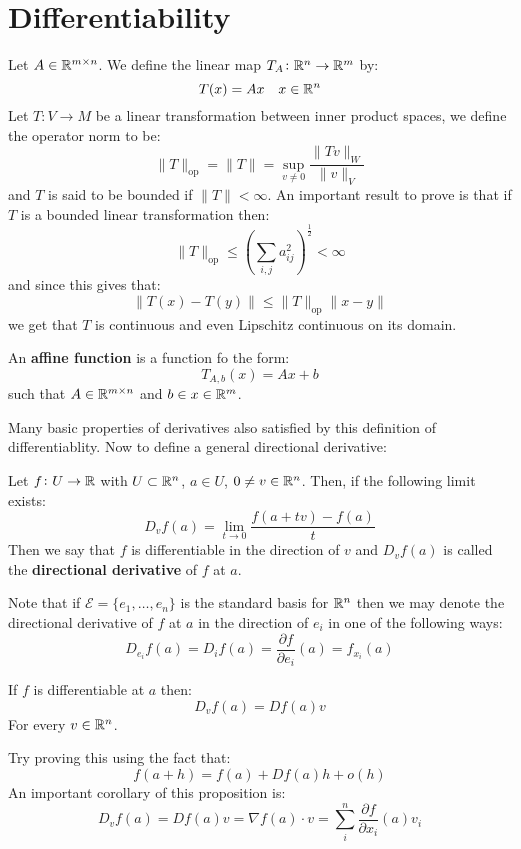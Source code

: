 \documentclass[11pt,a4paper]{article}
\begin{document}
	\section{Differentiability}
	Let $A \in \mathbb{R}^{m \times n}$. We define the linear map 
	$T_A \colon \mathbb{R}^n \to \mathbb{R}^m$ by:
	\[
		T(x) = Ax \quad x\in \mathbb{R}^n
	\]
	Let $T \colon V \to M$ be a linear transformation between inner product
	spaces, we define the operator norm to be:
	\[
		\|T\|_{\mathrm{op}} = \|T\| = \sup_{v \neq 0}{\frac{\|Tv\|_W}{\|v\|_V}}
	\]
	and $T$ is said to be bounded if $\|T\| < \infty$. An important result
	to prove is that if $T$ is a bounded linear transformation then:
	\[
		\|T\|_{\mathrm{op}} \le 
		\left(\sum_{i,j}{}a_{ij}^{2}\right)^{\frac{1}{2}} < \infty
	\]
	and since this gives that:
	\[
		\|T(x) - T(y)\| \le \|T\|_{\mathrm{op}}\|x-y\|
	\]
	we get that $T$ is continuous and even Lipschitz continuous on its domain.
	\begin{definition}
	An \textbf{affine function} is a function fo the form:
	\[
		T_{A,b}(x) = Ax + b
	\]
	such that $A\in\mathbb{R}^{m \times n}$ and $b\in x\in \mathbb{R}^{m}$.
	\end{definition}
	\noindent Many basic properties of derivatives also satisfied by this
	definition of differentiablity. Now to define a general directional
	derivative:
	\begin{definition}
		Let $f \colon U \to \mathbb{R}$ with $U \subset \mathbb{R}^n$, $a \in U$, $0 \neq v
		\in \mathbb{R}^n$. Then, if the following limit exists:
		\[
			D_v f(a) = \lim_{t \to 0}{\frac{f(a + tv) - f(a)}{t}}
		\]
		Then we say that $f$ is differentiable in the direction of $v$ and
		$D_v f(a)$ is called the \textbf{directional derivative} of $f$ at $a$.
	\end{definition}
	\noindent
	Note that if $\mathcal{E} = \{e_1,\dots,e_n\}$ is the standard basis
	for $\mathbb{R}^n$ then we may denote the directional derivative of $f$ at $a$
	in the direction of $e_i$ in one of the following ways:
	\[
		D_{e_i} f(a) = D_i f(a) = \frac{\partial f}{\partial e_i}(a) = 
		f_{x_i}(a)
	\]
	\begin{proposition}
		If $f$ is differentiable at $a$ then:
			\[
				D_v f(a) = D f(a) v
			\]	
		For every $v \in \mathbb{R}^n$.
	\end{proposition} 
	\noindent Try proving this using the fact that:
	\[
		f(a+h) = f(a) + Df(a)h + o(h)
	\]
	An important corollary of this proposition is:
	\[
		D_vf(a) = D f(a) v = \nabla f(a) \cdot v = 
		\sum_{i}^{n}{\frac{\partial f}{\partial x_i}(a)v_i}
	\]
	
\end{document}
